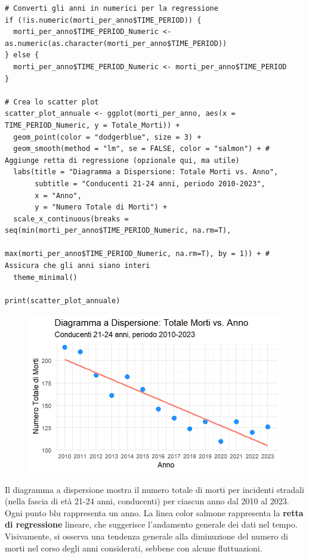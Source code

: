 \documentclass[14pt, openany, titlepage]{report} %
\begin{document}
\begin{center}
\begin{lstlisting}[breaklines=true]
# Converti gli anni in numerici per la regressione
if (!is.numeric(morti_per_anno$TIME_PERIOD)) {
  morti_per_anno$TIME_PERIOD_Numeric <- as.numeric(as.character(morti_per_anno$TIME_PERIOD))
} else {
  morti_per_anno$TIME_PERIOD_Numeric <- morti_per_anno$TIME_PERIOD
}

# Crea lo scatter plot
scatter_plot_annuale <- ggplot(morti_per_anno, aes(x = TIME_PERIOD_Numeric, y = Totale_Morti)) +
  geom_point(color = "dodgerblue", size = 3) +
  geom_smooth(method = "lm", se = FALSE, color = "salmon") + # Aggiunge retta di regressione (opzionale qui, ma utile)
  labs(title = "Diagramma a Dispersione: Totale Morti vs. Anno",
       subtitle = "Conducenti 21-24 anni, periodo 2010-2023",
       x = "Anno",
       y = "Numero Totale di Morti") +
  scale_x_continuous(breaks = seq(min(morti_per_anno$TIME_PERIOD_Numeric, na.rm=T),
                                  max(morti_per_anno$TIME_PERIOD_Numeric, na.rm=T), by = 1)) + # Assicura che gli anni siano interi
  theme_minimal()

print(scatter_plot_annuale)
\end{lstlisting}
\end{center}

\begin{figure}[H]
    \centering
    \includegraphics[width=12cm, height=7cm]{Rplot010.png}
\end{figure}

\noindent
Il diagramma a dispersione mostra il numero totale di morti per 
incidenti stradali (nella fascia di età 21-24 anni, conducenti)
per ciascun anno dal 2010 al 2023. Ogni punto blu rappresenta 
un anno. La linea color salmone rappresenta la \textbf{retta di regressione}
lineare, che suggerisce l'andamento generale dei dati nel tempo.
Visivamente, si osserva una 
tendenza generale alla diminuzione del numero di morti nel corso 
degli anni considerati, sebbene con alcune fluttuazioni.
\end{document}
